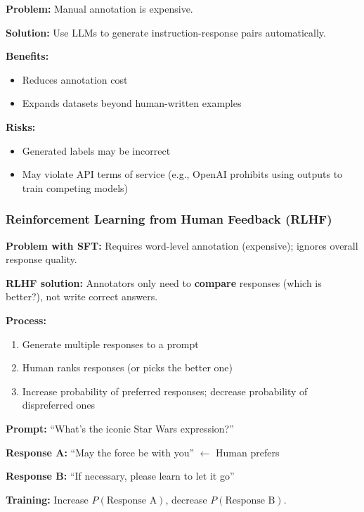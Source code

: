 \begin{defbox}
\textbf{Problem:} Manual annotation is expensive.

\textbf{Solution:} Use LLMs to generate instruction-response pairs automatically.

\textbf{Benefits:}
\begin{itemize}
  \item Reduces annotation cost
  \item Expands datasets beyond human-written examples
\end{itemize}

\textbf{Risks:}
\begin{itemize}
  \item Generated labels may be incorrect
  \item May violate API terms of service (e.g., OpenAI prohibits using outputs to train competing models)
\end{itemize}
\end{defbox}

\bigseparator

\subsubsection{Reinforcement Learning from Human Feedback (RLHF)}

\begin{defbox}[RLHF]
\textbf{Problem with SFT:} Requires word-level annotation (expensive); ignores overall response quality.

\textbf{RLHF solution:} Annotators only need to \textbf{compare} responses (which is better?), not write correct answers.

\textbf{Process:}
\begin{enumerate}
  \item Generate multiple responses to a prompt
  \item Human ranks responses (or picks the better one)
  \item Increase probability of preferred responses; decrease probability of dispreferred ones
\end{enumerate}
\end{defbox}

\begin{exbox}
\textbf{Prompt:} ``What's the iconic Star Wars expression?''

\textbf{Response A:} ``May the force be with you'' $\leftarrow$ Human prefers

\textbf{Response B:} ``If necessary, please learn to let it go''

\textbf{Training:} Increase $P(\text{Response A})$, decrease $P(\text{Response B})$.
\end{exbox}

